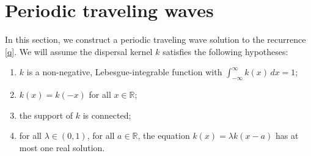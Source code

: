 \documentclass[11pt]{article}
\theoremstyle{definition}
\newtheorem{rem}[thm]{Remark}
\numberwithin{equation}{section}
\numberwithin{thm}{section}
\begin{document}
\section{Periodic traveling waves}

In this section, we construct a periodic traveling wave solution to the recurrence \eqref{q}. We will assume the dispersal kernel $k$ satisfies the following hypotheses:

\def\Hone{(\text{H1})}
\def\Htwo{(\text{H2})}
\def\Hthree{(\text{H3})}
\def\Hfour{(\text{H4})}


\begin{enumerate}[(H1)]
\item $k$ is a non-negative, Lebesgue-integrable function with $\int_{-\infty}^{\infty} k(x) \, dx = 1$;

\item $k(x)=k(-x)$ for all $x\in\mathbb R$;

\item the support of $k$ is connected;

\item  for all $\lambda\in(0,1)$, for all $a\in\mathbb R$, the equation $k(x)=\lambda k(x-a)$ has at most one real solution.
\end{enumerate}



\end{document}
